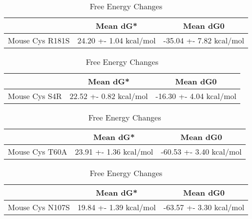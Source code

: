   \begin{table}[ht]
    \centering
    \begin{tabular}{|c|c|c|}
    \hline
      & Mean dG* & Mean dG0 \\
    \hline
Mouse Cys R181S & 24.20 +- 1.04 kcal/mol & -35.04 +- 7.82 kcal/mol \\
    \hline
    \end{tabular}
    \caption{Free Energy Changes}
    \end{table}


    \begin{table}[ht]
      \centering
      \begin{tabular}{|c|c|c|}
      \hline
        & Mean dG* & Mean dG0 \\
      \hline
 Mouse Cys S4R & 22.52 +- 0.82 kcal/mol & -16.30 +- 4.04 kcal/mol \\
      \hline
      \end{tabular}
      \caption{Free Energy Changes}
      \end{table}


        \begin{table}[ht]
          \centering
          \begin{tabular}{|c|c|c|}
          \hline
            & Mean dG* & Mean dG0 \\
          \hline
Mouse Cys T60A & 23.91 +- 1.36 kcal/mol & -60.53 +- 3.40 kcal/mol \\
          \hline
          \end{tabular}
          \caption{Free Energy Changes}
          \end{table}

          \begin{table}[ht]
            \centering
            \begin{tabular}{|c|c|c|}
            \hline
              & Mean dG* & Mean dG0 \\
            \hline
Mouse Cys N107S & 19.84 +- 1.39 kcal/mol & -63.57 +- 3.30 kcal/mol \\
            \hline
            \end{tabular}
            \caption{Free Energy Changes}
            \end{table}

              
          

              

                                        